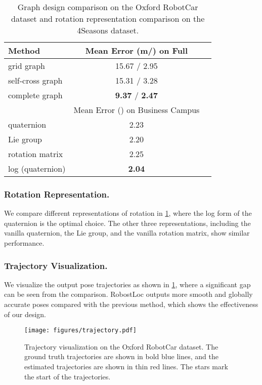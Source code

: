 \documentclass[letterpaper]{article} \usepackage{aaai23}  \usepackage{times}  \usepackage{helvet}  \usepackage{courier}  \usepackage[hyphens]{url}  \usepackage{graphicx} \urlstyle{rm} \def\UrlFont{\rm}  \usepackage{natbib}  \usepackage{caption} \frenchspacing  \setlength{\pdfpagewidth}{8.5in} \setlength{\pdfpageheight}{11in} \usepackage{booktabs}
\theoremstyle{remark}
\theoremstyle{plain}
\begin{document}
\begin{table}[!htb]\footnotesize
\centering
\begin{tabular}{l  c   c} 
\toprule
\multirow{1}{*}{Method} & \multicolumn{1}{c}{Mean Error (m/) on Full} \\
\midrule
grid graph & 15.67 / 2.95  \\
self-cross graph & 15.31 / 3.28  \\
complete graph & \textbf{9.37} / \textbf{2.47}  \\
\midrule
\multirow{1}{*}{} & \multicolumn{1}{c}{Mean Error () on Business Campus}  \\
\midrule
quaternion & 2.23  \\
Lie group & 2.20  \\
rotation matrix & 2.25  \\
log (quaternion) & \textbf{2.04}  \\
\bottomrule
\end{tabular}
\caption{Graph design comparison on the Oxford RobotCar dataset and rotation representation comparison on the 4Seasons dataset.}
\label{tab:graph}
\end{table}


\subsubsection{Rotation Representation.}
We compare different representations of rotation in \cref{tab:graph}, where the log form of the quaternion is the optimal choice. The other three representations, including the vanilla quaternion, the Lie group, and the vanilla rotation matrix, show similar performance.





\subsubsection{Trajectory Visualization.}
We visualize the output pose trajectories as shown in \cref{fig:trajectory}, where a significant gap can be seen from the comparison. RobostLoc outputs more smooth and globally accurate poses compared with the previous method, which shows the effectiveness of our design.
\begin{figure}[!t]
\begin{center}
\texttt{[image: figures/trajectory.pdf]}
\end{center}
\caption{Trajectory visualization on the Oxford RobotCar dataset. The ground truth trajectories are shown in bold blue lines, and the estimated trajectories are shown in thin red lines. The stars mark the start of the trajectories.}
\label{fig:trajectory}
\end{figure}
\end{document}
